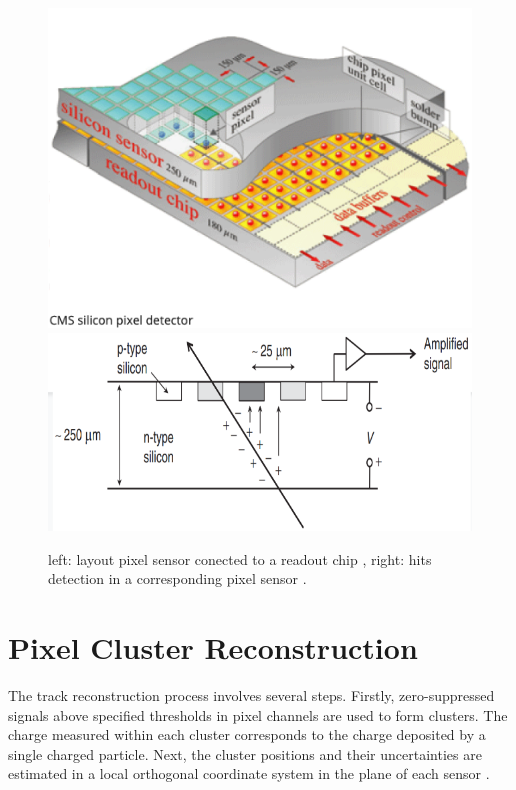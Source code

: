 \begin{center}
  \begin{figure}[h]
    \centering
    \includegraphics[scale=.3]{Chapter2/PixelSensor.png} \includegraphics[scale=.3]{Chapter2/hit.png}
    \caption[PixelSensor]{ left: layout pixel sensor conected to a readout chip , right: hits detection in a corresponding  pixel sensor \citep{thomson_2013}. }
    \label{module and hit}
  \end{figure}
\end{center}

\section{Pixel Cluster Reconstruction}

The track reconstruction process involves several steps. Firstly, zero-suppressed signals above specified thresholds in pixel  channels  are used to form clusters. The charge measured within each cluster corresponds to the charge deposited by a single charged particle. Next, the cluster positions and their uncertainties are estimated in a local orthogonal coordinate system  in the plane of each sensor \cite{Track_Reco_2014}. \\

